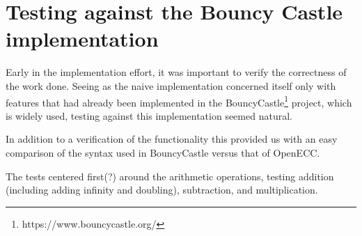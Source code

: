 \section{Testing against the Bouncy Castle implementation}

Early in the implementation effort, it was important to verify the correctness of the work done. Seeing
as the naive implementation concerned itself only with features that had already been implemented in
the BouncyCastle\footnote{https://www.bouncycastle.org/} project, which is widely used, testing against
this implementation seemed natural.

In addition to a verification of the functionality this provided us with an easy comparison of the syntax
used in BouncyCastle versus that of OpenECC.

The tests centered first(?) around the arithmetic operations, testing addition (including adding infinity
and doubling), subtraction, and multiplication.